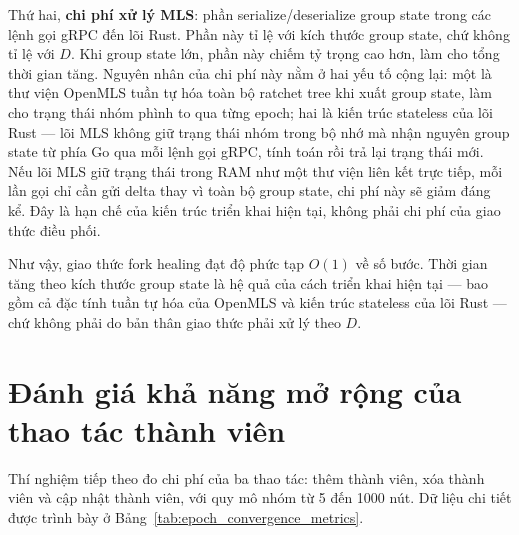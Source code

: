 \documentclass[../DoAn.tex]{subfiles}
\begin{document}
Thứ hai, \textbf{chi phí xử lý MLS}: phần serialize/deserialize group state trong các lệnh gọi gRPC đến lõi Rust. Phần này tỉ lệ với kích thước group state, chứ không tỉ lệ với $D$. Khi group state lớn, phần này chiếm tỷ trọng cao hơn, làm cho tổng thời gian tăng. Nguyên nhân của chi phí này nằm ở hai yếu tố cộng lại: một là thư viện OpenMLS \cite{openmls2026doc} tuần tự hóa toàn bộ ratchet tree khi xuất group state, làm cho trạng thái nhóm phình to qua từng epoch; hai là kiến trúc stateless của lõi Rust --- lõi MLS không giữ trạng thái nhóm trong bộ nhớ mà nhận nguyên group state từ phía Go qua mỗi lệnh gọi gRPC, tính toán rồi trả lại trạng thái mới. Nếu lõi MLS giữ trạng thái trong RAM như một thư viện liên kết trực tiếp, mỗi lần gọi chỉ cần gửi delta thay vì toàn bộ group state, chi phí này sẽ giảm đáng kể. Đây là hạn chế của kiến trúc triển khai hiện tại, không phải chi phí của giao thức điều phối.
	
Như vậy, giao thức fork healing đạt độ phức tạp $O(1)$ về số bước. Thời gian tăng theo kích thước group state là hệ quả của cách triển khai hiện tại --- bao gồm cả đặc tính tuần tự hóa của OpenMLS và kiến trúc stateless của lõi Rust --- chứ không phải do bản thân giao thức phải xử lý theo $D$.
	
	\section{Đánh giá khả năng mở rộng của thao tác thành viên}
	\label{sec:danh_gia_scalability}
	
Thí nghiệm tiếp theo đo chi phí của ba thao tác: thêm thành viên, xóa thành viên và cập nhật thành viên, với quy mô nhóm từ 5 đến 1000 nút. Dữ liệu chi tiết được trình bày ở Bảng~\ref{tab:epoch_convergence_metrics}.
	
	\begin{table}[htbp]
		\centering
		\caption{Chi phí thao tác thành viên theo quy mô nhóm}
		\label{tab:epoch_convergence_metrics}
	\end{table}
	
\end{document}

